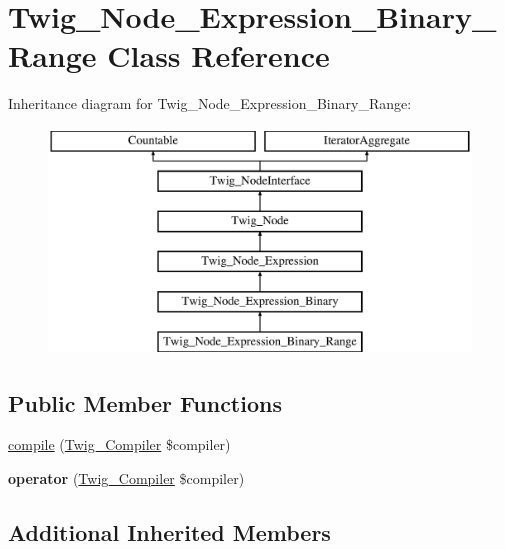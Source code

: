 \hypertarget{classTwig__Node__Expression__Binary__Range}{}\section{Twig\+\_\+\+Node\+\_\+\+Expression\+\_\+\+Binary\+\_\+\+Range Class Reference}
\label{classTwig__Node__Expression__Binary__Range}
Inheritance diagram for Twig\+\_\+\+Node\+\_\+\+Expression\+\_\+\+Binary\+\_\+\+Range\+:\begin{figure}[H]
\begin{center}
\leavevmode
\includegraphics[height=6.000000cm]{classTwig__Node__Expression__Binary__Range}
\end{center}
\end{figure}
\subsection*{Public Member Functions}
\begin{DoxyCompactItemize}
\item 
\hyperlink{classTwig__Node__Expression__Binary__Range_a3ab87f75512383dd78ee56e995329ea4}{compile} (\hyperlink{classTwig__Compiler}{Twig\+\_\+\+Compiler} \$compiler)
\item 
{\bfseries operator} (\hyperlink{classTwig__Compiler}{Twig\+\_\+\+Compiler} \$compiler)\hypertarget{classTwig__Node__Expression__Binary__Range_a68f9166646a7f5f945317209532ebfa0}{}\label{classTwig__Node__Expression__Binary__Range_a68f9166646a7f5f945317209532ebfa0}

\end{DoxyCompactItemize}
\subsection*{Additional Inherited Members}


